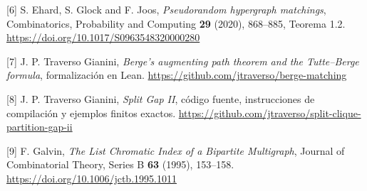 \documentclass[spanish,11pt,a4paper]{article}
\begin{document}
{[}6{]} S. Ehard, S. Glock and F. Joos, \emph{Pseudorandom hypergraph matchings}, Combinatorics, Probability and Computing \textbf{29} (2020), 868--885, Teorema 1.2. \url{https://doi.org/10.1017/S0963548320000280}

{[}7{]} J. P. Traverso Gianini, \emph{Berge's augmenting path theorem and the Tutte--Berge formula}, formalización en Lean. \url{https://github.com/jtraverso/berge-matching}

{[}8{]} J. P. Traverso Gianini, \emph{Split Gap II}, código fuente, instrucciones de compilación y ejemplos finitos exactos. \url{https://github.com/jtraverso/split-clique-partition-gap-ii}

{[}9{]} F. Galvin, \emph{The List Chromatic Index of a Bipartite Multigraph}, Journal of Combinatorial Theory, Series B \textbf{63} (1995), 153--158. \url{https://doi.org/10.1006/jctb.1995.1011}
\end{document}
